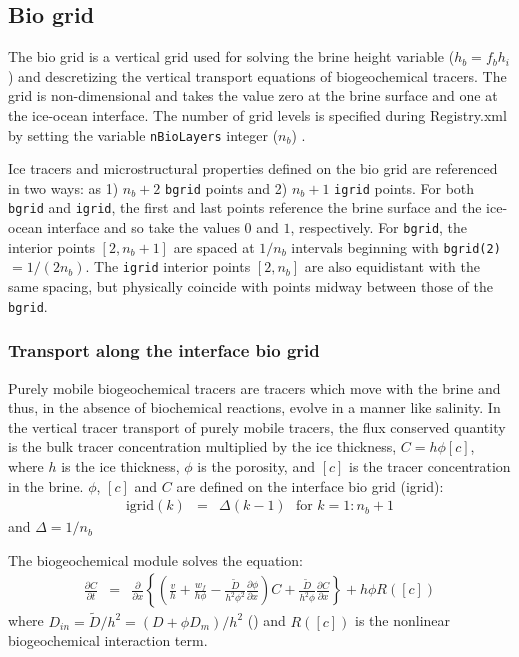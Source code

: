\subsection{Bio grid}
\label{sec:bio_grid}
The bio grid  is a vertical grid used for solving the brine height
variable ($h_b = f_b h_i$) and descretizing the vertical transport equations of
biogeochemical tracers. The grid is non-dimensional and takes the value zero at the brine surface and one at the ice-ocean
interface.  The number of grid levels is specified during Registry.xml  by setting the variable {\tt nBioLayers}
integer ($n_b$) .  

Ice tracers and microstructural properties defined on the bio grid are
 referenced in two ways: as
1)  $n_b+2$ {\tt bgrid} points  and 2) $n_b+1$ {\tt igrid} points.
For both  {\tt bgrid} and {\tt igrid}, the first and last points reference
the brine surface and the ice-ocean interface and so take the values $0$ and $1$,
respectively.  For  {\tt bgrid}, the interior points $[2, n_b+1]$ are
spaced at $1/n_b$ intervals beginning with {\tt bgrid(2)}$ =
1/(2n_b)$.  The {\tt igrid} interior points $[2, n_b]$ are also
equidistant with the same spacing, but physically coincide  with
points midway between those of the {\tt bgrid}.

 \subsubsection{Transport along the interface bio grid}  

Purely mobile biogeochemical tracers are tracers which move with the brine and thus,
in the absence of biochemical reactions, evolve in a manner like salinity.  In the vertical tracer transport of purely mobile tracers, the flux conserved quantity is the bulk
tracer concentration multiplied by the ice thickness, \bgcie $C = h\phi
[c]$, where $h$ is the ice thickness, $\phi$ is the porosity, and
$[c]$ is the tracer concentration in the brine.  $\phi$, $[c]$ and $C$  are defined on the interface bio grid (igrid):
\begin{eqnarray}
\mbox{igrid}(k) & =  & \Delta (k-1) \ \ \ \mbox{for }k = 1:n_b+1
\end{eqnarray}
and $\Delta = 1/n_b$

The biogeochemical module solves the equation:
\begin{eqnarray}
\frac{\partial C}{\partial t} & =& \frac{\partial }{\partial x}\left\{
\left( \frac{v}{h} + \frac{w_f}{h\phi} -
  \frac{\tilde{D}}{h^2\phi^2}\frac{\partial \phi}{\partial x} \right) C
+ \frac{\tilde{D}}{h^2\phi}\frac{\partial C}{\partial x} 
\right\} + h\phi R([c]) \label{eqn:mobile_transport}
\end{eqnarray}
where $D_{in} = \tilde{D}/h^2 =  (D + \phi D_m)/h^2$ (\cite{Jeffery:tracers:2011})
and $R([c])$ is
the nonlinear biogeochemical interaction term.

